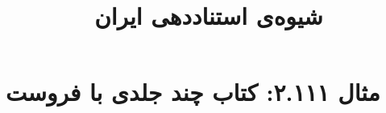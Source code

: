 \documentclass[a4paper,10pt]{article}
\begin{document}
\title{شیوه‌ی استناددهی ایران
 }
\author{}
\date{}
\maketitle



\section*{مثال ۲.۱۱۱: کتاب چند جلدی با فروست}

\cite{مؤمنی1358}






\end{document}
